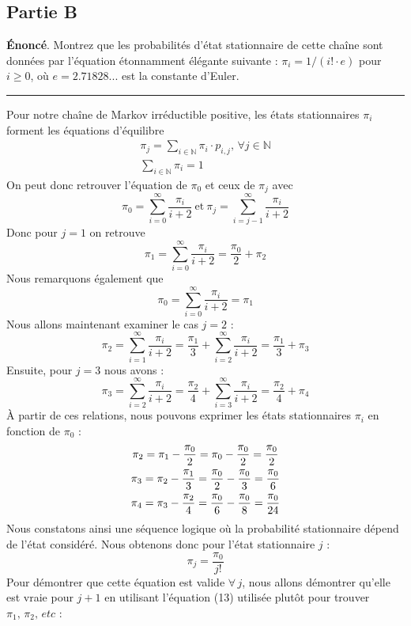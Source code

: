 \documentclass{article}
\begin{document}
\newpage
\subsection*{Partie B}
\textbf{Énoncé}. Montrez que les probabilités d'état stationnaire de cette chaîne sont
données par l'équation étonnamment élégante suivante : $\pi_i=1/(i!\cdot e)$ pour 
$i\ge0$, où $e=2.71828...$ est la constante d'Euler.
\vspace{.2cm}
\hrule
\vspace{.4cm}
Pour notre chaîne de Markov irréductible positive, les états stationnaires $\pi_i$ forment 
les équations d'équilibre
\begin{gather}
    \pi_j=\sum_{i\in\mathbb{N}}\pi_i\cdot p_{i,j},\,\forall j\in\mathbb{N} \\
    \sum_{i\in\mathbb{N}} \pi_i=1
\end{gather}
On peut donc retrouver l'équation de $\pi_0$ et ceux de $\pi_j$ avec
\[
    \pi_0=\sum_{i=0}^{\infty}\frac{\pi_i}{i+2}\ \text{et}\ \pi_j=\sum_{i=j-1}^{\infty}\frac{\pi_i}{i+2}
\]
Donc pour $j=1$ on retrouve
\[
    \pi_1=\sum_{i=0}^{\infty}\frac{\pi_i}{i+2}=\frac{\pi_0}{2}+\pi_2
\]
Nous remarquons également que 
\[
\pi_0=\sum_{i=0}^{\infty}\frac{\pi_i}{i+2}=\pi_1
\]
Nous allons maintenant examiner le cas $j=2$ :
\[
    \pi_2=\sum_{i=1}^{\infty}\frac{\pi_i}{i+2}=\frac{\pi_1}{3}+\sum_{i=2}^{\infty}\frac{\pi_i}{i+2}=\frac{\pi_1}{3}+\pi_3
\]
Ensuite, pour $j=3$ nous avons :
\[
    \pi_3=\sum_{i=2}^{\infty}\frac{\pi_i}{i+2}=\frac{\pi_2}{4}+\sum_{i=3}^{\infty}\frac{\pi_i}{i+2}=\frac{\pi_2}{4}+\pi_4
\]
À partir de ces relations, nous pouvons exprimer les états stationnaires $\pi_i$ en 
fonction de $\pi_0$ :
\begin{gather}
    \pi_2=\pi_1-\frac{\pi_0}{2}=\pi_0-\frac{\pi_0}{2}=\frac{\pi_0}{2} \notag \\
    \pi_3=\pi_2-\frac{\pi_1}{3}=\frac{\pi_0}{2}-\frac{\pi_0}{3}=\frac{\pi_0}{6} \notag \\
    \pi_4=\pi_3-\frac{\pi_2}{4}=\frac{\pi_0}{6}-\frac{\pi_0}{8}=\frac{\pi_0}{24} \notag
\end{gather}
Nous constatons ainsi une séquence logique où la probabilité stationnaire dépend de 
l'état considéré. Nous obtenons donc pour l'état stationnaire $j$ :
\begin{equation}
    \pi_j=\frac{\pi_0}{j!}
\end{equation}
Pour démontrer que cette équation est valide $\forall\, j$, nous allons démontrer qu'elle
est vraie pour $j+1$ en utilisant l'équation (13) utilisée plutôt pour trouver $\pi_1,\,\pi_2,\,etc$ :
\end{document}
